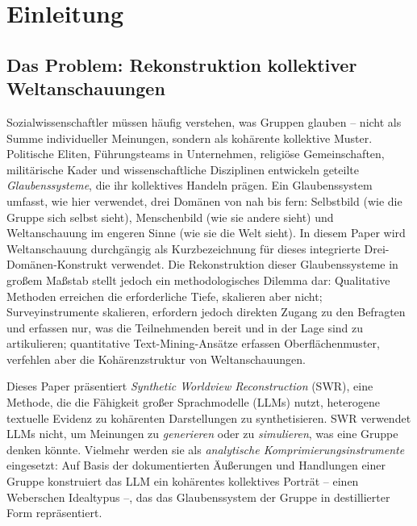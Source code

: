 \documentclass[11pt,a4paper]{article}
\begin{document}
\newpage
\setcounter{page}{1}

\section{Einleitung}
\label{sec:introduction}

\subsection{Das Problem: Rekonstruktion kollektiver Weltanschauungen}
\label{sec:intro:problem}

Sozialwissenschaftler m\"ussen h\"aufig verstehen, was Gruppen glauben -- nicht als Summe individueller Meinungen, sondern als koh\"arente kollektive Muster. Politische Eliten, F\"uhrungsteams in Unternehmen, religi\"ose Gemeinschaften, milit\"arische Kader und wissenschaftliche Disziplinen entwickeln geteilte \emph{Glaubenssysteme}, die ihr kollektives Handeln pr\"agen. Ein Glaubenssystem umfasst, wie hier verwendet, drei Dom\"anen von nah bis fern: Selbstbild (wie die Gruppe sich selbst sieht), Menschenbild (wie sie andere sieht) und Weltanschauung im engeren Sinne (wie sie die Welt sieht). In diesem Paper wird \glqq{}Weltanschauung\grqq{} durchg\"angig als Kurzbezeichnung f\"ur dieses integrierte Drei-Dom\"anen-Konstrukt verwendet. Die Rekonstruktion dieser Glaubenssysteme in gro\ss{}em Ma\ss{}stab stellt jedoch ein methodologisches Dilemma dar: Qualitative Methoden erreichen die erforderliche Tiefe, skalieren aber nicht; Surveyinstrumente skalieren, erfordern jedoch direkten Zugang zu den Befragten und erfassen nur, was die Teilnehmenden bereit und in der Lage sind zu artikulieren; quantitative Text-Mining-Ans\"atze erfassen Oberfl\"achenmuster, verfehlen aber die Koh\"arenzstruktur von Weltanschauungen.

Dieses Paper pr\"asentiert \emph{Synthetic Worldview Reconstruction} (SWR), eine Methode, die die F\"ahigkeit gro\ss{}er Sprachmodelle (LLMs) nutzt, heterogene textuelle Evidenz zu koh\"arenten Darstellungen zu synthetisieren. SWR verwendet LLMs nicht, um Meinungen zu \emph{generieren} oder zu \emph{simulieren}, was eine Gruppe denken k\"onnte. Vielmehr werden sie als \emph{analytische Komprimierungsinstrumente} eingesetzt: Auf Basis der dokumentierten \"Au\ss{}erungen und Handlungen einer Gruppe konstruiert das LLM ein koh\"arentes kollektives Portr\"at -- einen Weberschen Idealtypus \citep{Weber1904} --, das das Glaubenssystem der Gruppe in destillierter Form repr\"asentiert.
\end{document}

